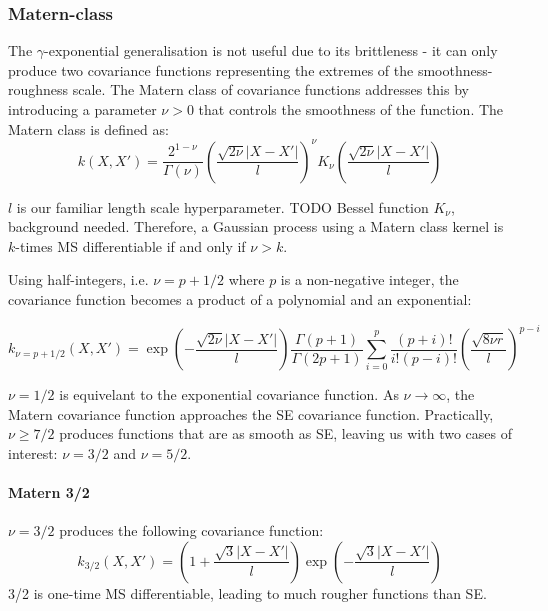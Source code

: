 

\subsubsection{Matern-class}
The $\gamma$-exponential generalisation is not useful due to its brittleness - it can only produce two covariance functions representing the extremes of the smoothness-roughness scale. The Matern class of covariance functions addresses this by introducing a parameter $\nu > 0$ that controls the smoothness of the function. The Matern class is defined as:
\begin{equation*}
    k(X,X') = \frac{2^{1 - \nu}}{\Gamma(\nu)}\left(\frac{\sqrt{2\nu}|X - X'|}{l}\right)^{\nu}K_{\nu}\left(\frac{\sqrt{2\nu}|X - X'|}{l}\right)
\end{equation*}

$l$ is our familiar length scale hyperparameter. TODO Bessel function $K_{\nu}$, background needed. Therefore, a Gaussian process using a Matern class kernel is $k$-times MS differentiable if and only if $\nu > k$. 

Using half-integers, i.e. $\nu = p + 1/2$ where $p$ is a non-negative integer, the covariance function becomes a product of a polynomial and an exponential:

\begin{equation*}
    k_{\nu = p + 1/2}(X,X') = \exp \left(- \frac{\sqrt{2\nu}|X - X'|}{l} \right) \frac{\Gamma(p+1)}{\Gamma(2p+1)} \sum_{i=0}^p \frac{(p + i)!}{i!(p-i)!} \left( \frac{\sqrt{8\nu r}}{l} \right)^{p-i}
\end{equation*}

$\nu = 1/2$ is equivelant to the exponential covariance function. As $\nu \to \infty$, the Matern covariance function approaches the SE covariance function. Practically, $\nu \geq 7/2$ produces functions that are as smooth as SE, leaving us with two cases of interest: $\nu = 3/2$ and $\nu = 5/2$.

\paragraph{Matern 3/2}
$\nu = 3/2$ produces the following covariance function:
\begin{equation*}
    k_{3/2}(X,X') = \left(1 + \frac{\sqrt{3}|X - X'|}{l} \right) \exp \left(-\frac{\sqrt{3}|X - X'|}{l} \right)
\end{equation*}
3/2 is one-time MS differentiable, leading to much rougher functions than SE.

